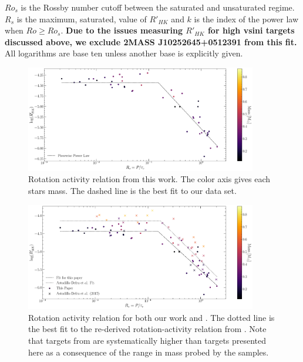 \noindent $Ro_{s}$ is the Rossby number cutoff between the saturated and
unsaturated regime. $R_{s}$ is the maximum, saturated, value of $R'_{HK}$ and
$k$ is the index of the power law when $Ro \geq Ro_{s}$. \textbf{Due to the
issues measuring $R'_{HK}$ for high vsini targets discussed above, we exclude
2MASS J10252645+0512391 from this fit.} All logarithms are base ten unless
another base is explicitly given.
\begin{table}[ht]
  \small
    \centering
    \setlength{\tabcolsep}{4pt}
    
  \caption{Calculated Rossby Numbers and $R'_{HK}$ values. All circular data
  points in Figures \ref{fig:RpHKvsRossbySelf} \& \ref{fig:RpHKvsRossbyDef}
  are present in this table. Masses are taken from the MEarth database. A
  machine readable version of this table is \textbf{available}}
    \label{tab:finalData}
\end{table}
\begin{figure}
    \centering
    \includegraphics[width=0.9\textwidth]{figures/magActivity/RpHKvsR0_MC_justThisPaper.pdf}
	\caption{Rotation activity relation from this work. The color axis gives
	each stars mass. The dashed line is the best fit to our data set.}
    \label{fig:RpHKvsRossbySelf}
\end{figure}
\begin{figure}
    \centering
    \includegraphics[width=0.9\textwidth]{figures/magActivity/RpHKvsR0_MC.pdf}
	\caption{Rotation activity relation for both our work and \citet{Def17}.
	The dotted line is the best fit to the re-derived rotation-activity
	relation from \citet{Def17}.  Note that targets from \citet{Def17} are
	systematically higher than targets presented here as a consequence of the
	range in mass probed by the samples.}
    \label{fig:RpHKvsRossbyDef}
\end{figure}

